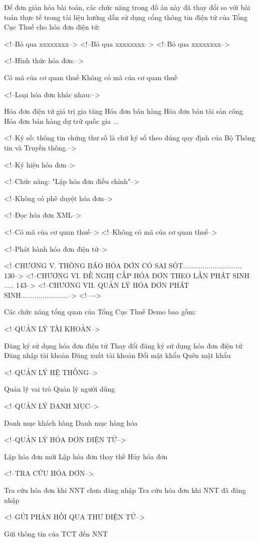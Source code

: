 
Để đơn giản hóa bài toán, các chức năng trong đồ án này đã thay đổi so với bài toán thực tế trong tài liệu hướng dẫn sử dụng cổng thông tin điện tử của Tổng Cục Thuế cho hóa đơn điện tử:

<!--Bỏ qua xxxxxxxx-->
<!--Bỏ qua xxxxxxxx-->
<!--Bỏ qua xxxxxxxx-->

<!--Hình thức hóa đơn:-->

Có mã của cơ quan thuế
Không có mã của cơ quan thuế

<!--Loại hóa đơn khác nhau:-->

Hóa đơn điện tử giá trị gia tăng
Hóa đơn bán hàng
Hóa đơn bán tài sản công
Hóa đơn bán hàng dự trữ quốc gia
...

<!--Ký số: thông tin chứng thư số là chữ ký số theo đúng quy định của Bộ Thông tin và Truyền thông.-->

<!--Ký hiệu hóa đơn-->

<!--Chức năng: "Lập hóa đơn điều chỉnh"-->

<!--Không có phê duyệt hóa đơn-->

<!--Đọc hóa đơn XML-->

<!--Có mã của cơ quan thuế-->
<!--Không có mã của cơ quan thuế-->

<!--Phát hành hóa đơn điện tử-->

<!--CHƯƠNG V. THÔNG BÁO HÓA ĐƠN CÓ SAI SÓT.............................. 130-->
<!--CHƯƠNG VI. ĐỀ NGHỊ CẤP HÓA ĐƠN THEO LẦN PHÁT SINH ..... 143-->
<!--CHƯƠNG VII. QUẢN LÝ HÓA ĐƠN PHÁT SINH........................-->
<!---->

Các chức năng tổng quan của Tổng Cục Thuế Demo bao gồm:

<!--QUẢN LÝ TÀI KHOẢN-->

Đăng ký sử dụng hóa đơn điện tử
Thay đổi đăng ký sử dụng hóa đơn điện tử
Đăng nhập tài khoản
Đăng xuất tài khoản
Đổi mật khẩu
Quên mật khẩu

<!--QUẢN LÝ HỆ THỐNG-->

Quản lý vai trò
Quản lý người dùng

<!--QUẢN LÝ DANH MỤC-->

Danh mục khách hàng
Danh mục hàng hóa

<!--QUẢN LÝ HÓA ĐƠN ĐIỆN TỬ-->

Lập hóa đơn mới
Lập hóa đơn thay thế
Hủy hóa đơn

<!--TRA CỨU HÓA ĐƠN-->

Tra cứu hóa đơn khi NNT chưa đăng nhập
Tra cứu hóa đơn khi NNT đã đăng nhập

<!--GỬI PHẢN HỒI QUA THƯ ĐIỆN TỬ-->

Gửi thông tin của TCT đến NNT